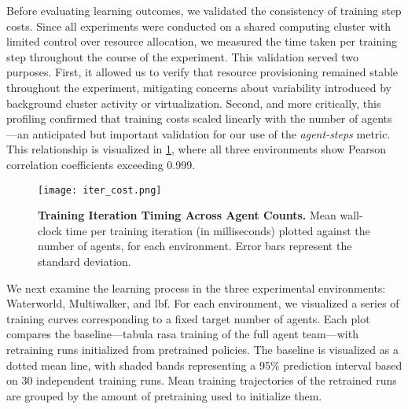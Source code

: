 \documentclass{article}
\begin{document}
Before evaluating learning outcomes, we validated the consistency of training step costs.
Since all experiments were conducted on a shared computing cluster with limited 
control over resource allocation, we measured the time taken per training
step throughout the course of the experiment. This validation served two purposes. First, 
it allowed us to verify that resource provisioning remained stable throughout the experiment, 
mitigating concerns about variability introduced by background cluster activity or virtualization.
Second, and more critically, this profiling confirmed that training costs scaled linearly 
with the number of agents—an anticipated but important validation for our use of the 
\emph{agent-steps} metric. This relationship is visualized in \cref{con1:fig:agent-steps}, 
where all three environments show Pearson correlation coefficients exceeding 0.999.
\begin{figure}[!ht]
    \centering
    \texttt{[image: iter\_cost.png]}
    \caption{\textbf{Training Iteration Timing Across Agent Counts.}
        Mean wall-clock time per training iteration (in milliseconds) plotted against the number 
        of agents, for each environment. Error bars represent the standard deviation.}
    \label{con1:fig:agent-steps}
\end{figure}
%

We next examine the learning process in the three experimental environments: 
Waterworld, Multiwalker, and \gls{lbf}. For each environment, 
we visualized a series of training curves corresponding to a fixed target number of agents.
Each plot compares the baseline—tabula rasa training of the full agent team—with 
retraining runs initialized from pretrained policies.
The baseline is visualized as a dotted mean line, with shaded bands 
representing a 95\% prediction interval based on 30 independent training runs.
Mean training trajectories of the retrained runs are grouped by the amount 
of pretraining used to initialize them.
\end{document}
